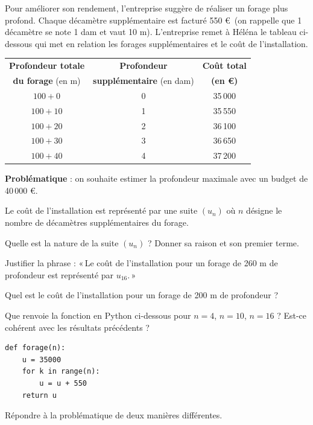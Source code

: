 \documentclass[12pt,a4paper]{book}
\begin{document}
Pour améliorer son rendement, l'entreprise suggère de réaliser un forage plus profond. Chaque décamètre supplémentaire est facturé 550 \euro\ (on rappelle que 1 décamètre se note 1 dam et vaut 10 m). L'entreprise remet à Héléna le tableau ci-dessous qui met en relation les forages supplémentaires et le coût de l'installation.

\begin{center}
\begin{tabular}{|c|c|c|}
	\hline
	\textbf{Profondeur totale} & \textbf{Profondeur} & \textbf{Coût total} \\
	\textbf{du forage} (en m) & \textbf{supplémentaire} (en dam) & \textbf{(en \euro)} \\
	\hline
	$100+0$ & 0 & 35\,000 \\
	\hline
	$100+10$ & 1 & 35\,550 \\
	\hline
	$100+20$ & 2 & 36\,100 \\
	\hline
	$100+30$ & 3 & 36\,650 \\
	\hline
	$100+40$ & 4 & 37\,200 \\
	\hline
\end{tabular}
\end{center}

\noindent\textbf{Problématique} : on souhaite estimer la profondeur maximale avec un budget de 40\,000 \euro.

\begin{enumMet}
	\item Le coût de l'installation est représenté par une suite $(u_n)$ où $n$ désigne le nombre de décamètres supplémentaires du forage.
	\begin{enumMet}
		\item Quelle est la nature de la suite $(u_n)$ ? Donner sa raison et son premier terme.
		\item Justifier la phrase : «\,Le coût de l'installation pour un forage de 260 m de profondeur est représenté par $u_{16}$.\,»
		\item Quel est le coût de l'installation pour un forage de 200 m de profondeur ?
	\end{enumMet}
	\item Que renvoie la fonction en Python ci-dessous pour $n=4$, $n=10$, $n=16$ ? Est-ce cohérent avec les résultats précédents ?

\begin{center}
\begin{minipage}{0.55\linewidth}
\begin{verbatim}
def forage(n):
    u = 35000
    for k in range(n):
        u = u + 550
    return u
\end{verbatim}
\end{minipage}
\end{center}

	\item Répondre à la problématique de deux manières différentes.
\end{enumMet}
\end{document}
